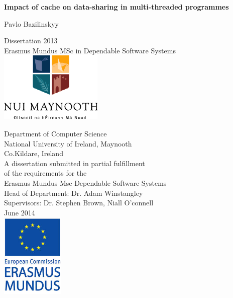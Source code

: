 \begin{titlepage}

	\begin{center}
		\vspace*{0.1cm}

		
		\Huge
		\textbf{Impact of cache on data-sharing in multi-threaded programmes}
		
		\Large
		\vspace*{1cm}
		Pavlo Bazilinskyy
		
		\normalsize
		\vspace*{0.2cm}
		Dissertation 2013 \\
		Erasmus Mundus MSc in Dependable Software Systems \\
			
		\vspace*{2cm}
		\includegraphics{Latex/logo.png}

			
		\vspace*{0.5cm}
		Department of Computer Science \\
		National University of Ireland, Maynooth \\
		Co.Kildare, Ireland  \\
		
		\scriptsize 
		\vspace{1cm}
		A dissertation submitted in partial fulfillment \\
		of the requirements for the \\
		Erasmus Mundus Msc Dependable Software Systems \\
		
		\vspace{0.5cm}
		\normalsize
		Head of Department: Dr. Adam Winstangley\\
		Supervisors: Dr. Stephen Brown, Niall O'connell\\
		June 2014 \\
		
		\vspace*{1cm}
		\includegraphics[width=3cm]{Latex/Erasmus.jpg}		
		
	\end{center}
\end{titlepage}
